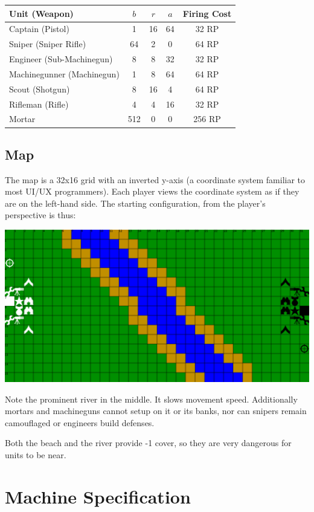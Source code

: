 \documentclass{article}
\begin{document}
\begin{tabular}{l | c | c | c | c}
    Unit (Weapon) & $b$ & $r$ & $a$ & Firing Cost \\ \hline
    Captain (Pistol) & 1 & 16 & 64 & 32 RP \\ \hline
    Sniper (Sniper Rifle) & 64 & 2 & 0 & 64 RP \\ \hline
    Engineer (Sub-Machinegun) & 8 & 8 & 32 & 32 RP \\ \hline
    Machinegunner (Machinegun) & 1 & 8 & 64 & 64 RP \\ \hline
    Scout (Shotgun) & 8 & 16 & 4 & 64 RP \\ \hline
    Rifleman (Rifle) & 4 & 4 & 16 & 32 RP \\ \hline
    Mortar & 512 & 0 & 0 & 256 RP \\ \hline
\end{tabular}

\subsection*{Map}

The map is a 32x16 grid with an inverted y-axis (a coordinate system familiar to
most UI/UX programmers). Each player views the coordinate system as if they are
on the left-hand side. The starting configuration, from the player's perspective
is thus:

\includegraphics[width=\textwidth]{res/map.png}

Note the prominent river in the middle. It slows movement speed. Additionally
mortars and machineguns cannot setup on it or its banks, nor can snipers remain
camouflaged or engineers build defenses.

Both the beach and the river provide -1 cover, so they are very dangerous for
units to be near.

\section*{Machine Specification}
\end{document}
